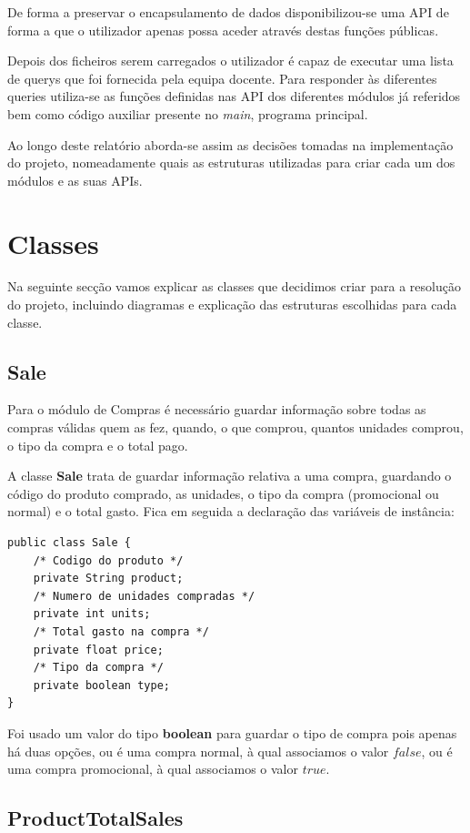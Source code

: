 \documentclass[10pt] {article}
\begin{document}
De forma a preservar o encapsulamento de dados disponibilizou-se uma API de
forma a que o utilizador apenas possa aceder através destas funções públicas.

Depois dos ficheiros serem carregados o utilizador é capaz de executar uma lista de querys que foi fornecida pela equipa docente.
Para responder às diferentes queries utiliza-se as funções definidas nas API dos diferentes módulos já referidos bem como código auxiliar presente no \emph{main}, programa principal.

Ao longo deste relatório aborda-se assim as decisões tomadas na implementação do projeto, nomeadamente quais as estruturas utilizadas para criar cada um dos módulos e as suas APIs.


\newpage
\section{Classes}
Na seguinte secção vamos explicar as classes que decidimos criar para a resolução do projeto, incluindo diagramas e explicação das estruturas escolhidas para cada classe.

\subsection{Sale}

Para o módulo de Compras é necessário guardar informação sobre todas as compras válidas quem as fez, quando, o que comprou, quantos unidades comprou, o tipo da compra e o total pago.

A classe \color{blue} \textbf{Sale} \color{black} trata de guardar informação relativa a uma compra, guardando o código do
produto comprado, as unidades, o tipo da compra (promocional ou normal) e o total gasto.
Fica em seguida a declaração das variáveis de instância:

\begin{lstlisting}
public class Sale {
	/* Codigo do produto */
	private String product;
	/* Numero de unidades compradas */
	private int units;
	/* Total gasto na compra */
	private float price;
	/* Tipo da compra */
	private boolean type;
}
\end{lstlisting}


Foi usado um valor do tipo \color{blue} \textbf{boolean} \color{black} para guardar o tipo de compra pois apenas há duas
opções, ou é uma compra normal, à qual associamos o valor $false$, ou é uma compra promocional, à qual associamos o valor
$true$.

\subsection{ProductTotalSales}
\end{document}
